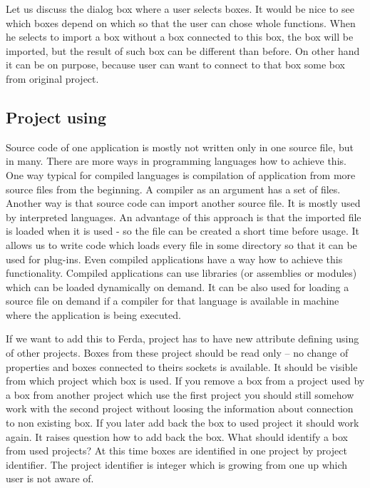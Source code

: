 \documentclass[a4paper,12pt]{book}
\begin{document}
Let us discuss the dialog box where a user selects boxes. It would be nice to see which boxes depend on which so that the user can chose whole functions. When he selects to import a box without a box connected to this box, the box will be imported, but the result of such box can be different than before. On other hand it can be on purpose, because user can want to connect to that box some box from original project.


\subsection{Project using}
Source code of one application is mostly not written only in one source file, but in many. There are more ways in programming languages how to achieve this. One way typical for compiled languages is compilation of application from more source files from the beginning. A compiler as an argument has a set of files. Another way is that source code can import another source file. It is mostly used by interpreted languages. An advantage of this approach is that the imported file is loaded when it is used - so the file can be created a short time before usage. It allows us to write code which loads every file in some directory so that it can be used for plug-ins. Even compiled applications have a way how to achieve this functionality. Compiled applications can use libraries (or assemblies or modules) which can be loaded dynamically on demand. It can be also used for loading a source file on demand if a compiler for that language is available in machine where the application is being executed.

If we want to add this to Ferda, project has to have new attribute defining using of other projects. Boxes from these project should be read only -- no change of properties and boxes connected to theirs sockets is available. It should be visible from which project which box is used. If you remove a box from a project used by a box from another project which use the first project you should still somehow work with the second project without loosing the information about connection to non existing box. If you later add back the box to used project it should work again. It raises question how to add back the box. What should identify a box from used projects? At this time boxes are identified in one project by project identifier. The project identifier is integer which is growing from one up which user is not aware of.
\end{document}
